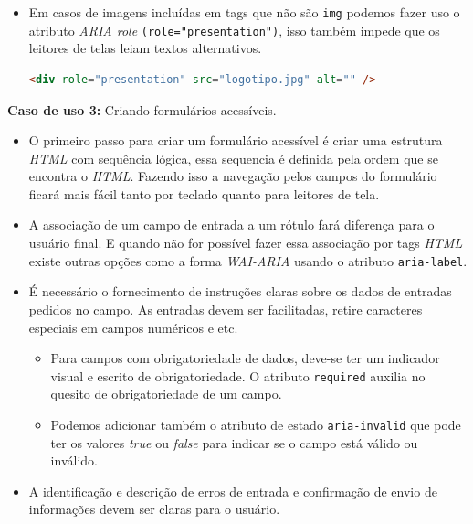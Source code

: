{\begin{itemize}
\begin{itemize}
\item Em casos de imagens incluídas em tags que não são \lstinline{img} podemos fazer uso o atributo \textit{ARIA role} \lstinline{(role="presentation")}, isso também impede que os leitores de telas leiam textos alternativos.
{\begin{lstlisting}[language=html,caption=usando atributo rele="presentation"]
<div role="presentation" src="logotipo.jpg" alt="" />
\end{lstlisting}}
\end{itemize}


 
\end{itemize}}

{
\textbf{Caso de uso 3:} Criando formulários acessíveis.

\begin{itemize}
    \item O primeiro passo para criar um formulário acessível é criar uma estrutura \textit{HTML} \cite{HTML} com sequência lógica, essa sequencia é definida pela ordem que se encontra o \textit{HTML}. Fazendo isso a navegação pelos campos do formulário ficará mais fácil tanto por teclado quanto para leitores de tela. 
    \item A associação de um campo de entrada a um rótulo fará diferença para o usuário final. E quando não for possível fazer essa associação por tags \textit{HTML} existe outras opções como a forma \textit{WAI-ARIA} \cite{WAI-ARIA} usando o atributo \lstinline{aria-label}.
    \item É necessário o fornecimento de instruções claras sobre os dados de entradas pedidos no campo. As entradas devem ser facilitadas, retire caracteres especiais em campos numéricos e etc. 
    \begin{itemize}
        \item Para campos com obrigatoriedade de dados, deve-se ter um indicador visual e escrito de obrigatoriedade. O atributo \lstinline{required} auxilia no quesito de obrigatoriedade de um campo.
        \item Podemos adicionar também o atributo de estado \lstinline{aria-invalid} que pode ter os valores \textit{true} ou \textit{false} para indicar se o campo está válido ou inválido.
    \end{itemize}
    \item A identificação e descrição de erros de entrada e confirmação de envio de informações devem ser claras para o usuário. 
    \begin{itemize}

\end{itemize}
\end{itemize}}
